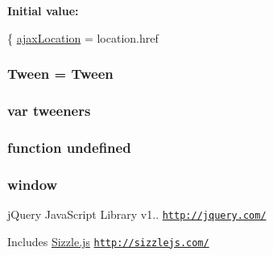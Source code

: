 {\bfseries Initial value\+:}
\begin{DoxyCode}
\{
    \hyperlink{jquery-1_89_81_8js_a1661d4e1676e7c6ffde5a3cb8d8ae246}{ajaxLocation} = location.href
\end{DoxyCode}
\hypertarget{jquery-1_89_81_8js_a91e55267cc469e865a6a7c6cfc51c7b1}{
\subsubsection[{Tween}]{ Tween = Tween}}\label{jquery-1_89_81_8js_a91e55267cc469e865a6a7c6cfc51c7b1}
\hypertarget{jquery-1_89_81_8js_a948afd2431eec272c99689edddfb6850}{
\subsubsection[{tweeners}]{\setlength{\rightskip}{0pt plus 5cm}var tweeners}}\label{jquery-1_89_81_8js_a948afd2431eec272c99689edddfb6850}
\hypertarget{jquery-1_89_81_8js_a08113a236cc18d2a9d5ce27e638012be}{
\subsubsection[{undefined}]{\setlength{\rightskip}{0pt plus 5cm}function undefined}}\label{jquery-1_89_81_8js_a08113a236cc18d2a9d5ce27e638012be}
\hypertarget{jquery-1_89_81_8js_a04a8a2bbfa9c15500892b8e5033d625b}{
\subsubsection[{window}]{\setlength{\rightskip}{0pt plus 5cm}window}}\label{jquery-1_89_81_8js_a04a8a2bbfa9c15500892b8e5033d625b}
j\+Query Java\+Script Library v1.. \href{http://jquery.com/}{\tt http\+://jquery.\+com/}

Includes \hyperlink{_sizzle_8js}{Sizzle.\+js} \href{http://sizzlejs.com/}{\tt http\+://sizzlejs.\+com/}

